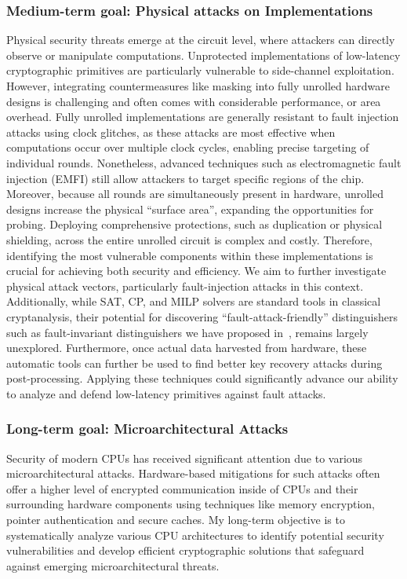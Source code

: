 \subsubsection{Medium-term goal: Physical attacks on Implementations}
Physical security threats emerge at the circuit level, where attackers can directly observe or manipulate computations.
Unprotected implementations of low-latency cryptographic primitives are particularly vulnerable to side-channel exploitation.
However, integrating countermeasures like masking into fully unrolled hardware designs is challenging and often comes with considerable performance, or area overhead.
Fully unrolled implementations are generally resistant to fault injection attacks using clock glitches, as these attacks are most effective when computations occur over multiple clock cycles, enabling precise targeting of individual rounds.
Nonetheless, advanced techniques such as electromagnetic fault injection (EMFI) still allow attackers to target specific regions of the chip.
Moreover, because all rounds are simultaneously present in hardware, unrolled designs increase the physical ``surface area'', expanding the opportunities for probing.
Deploying comprehensive protections, such as duplication or physical shielding, across the entire unrolled circuit is complex and costly.
Therefore, identifying the most vulnerable components within these implementations is crucial for achieving both security and efficiency.
We aim to further investigate physical attack vectors, particularly fault-injection attacks in this context.
Additionally, while SAT, CP, and MILP solvers are standard tools in classical cryptanalysis, their potential for discovering ``fault-attack-friendly'' distinguishers such as fault-invariant distinguishers we have proposed in~, remains largely unexplored.
Furthermore, once actual data harvested from hardware, these automatic tools can further be used to find better key recovery attacks during post-processing.
Applying these techniques could significantly advance our ability to analyze and defend low-latency primitives against fault attacks.

\vspace*{-0.1cm}
\subsubsection{Long-term goal: Microarchitectural Attacks}
Security of modern CPUs has received significant attention due to various microarchitectural attacks.
Hardware-based mitigations for such attacks often offer a higher level of encrypted communication inside of CPUs and their surrounding hardware components using techniques like memory encryption, pointer authentication and secure caches.
My long-term objective is to systematically analyze various CPU architectures to identify potential security vulnerabilities and develop efficient cryptographic solutions that safeguard against emerging microarchitectural threats.

